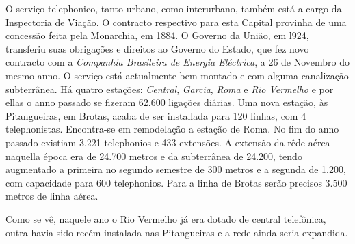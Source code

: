 \begin{citacao}
O serviço telephonico, tanto urbano, como interurbano, também está a cargo da Inspectoria de Viação.
O contracto respectivo para esta Capital provinha de uma concessão feita pela Monarchia, em 1884.
O Governo da União, em l924, transferiu suas obrigações e direitos ao Governo do Estado, que fez novo contracto com a \textit{Companhia Brasileira de Energia Eléctrica}, a 26 de Novembro do mesmo anno.
O serviço está actualmente bem montado e com alguma canalização subterrânea.
Há quatro estações: \textit{Central}, \textit{Garcia}, \textit{Roma} e \textit{Rio Vermelho} e por ellas o anno passado se fizeram 62.600 ligações diárias.
Uma nova estação, às Pitangueiras, em Brotas, acaba de ser installada para 120 linhas, com 4 telephonistas.
Encontra-se em remodelação a estação de Roma.
No fim do anno passado existiam 3.221 telephonios e 433 extensões.
A extensão da rêde aérea naquella época era de 24.700 metros e da subterrânea de 24.200, tendo augmentado a primeira no segundo semestre de 300 metros e a segunda
de 1.200, com capacidade para 600 telephonios.
Para a linha de Brotas serão precisos 3.500 metros de linha aérea. \cite[pp.~266-267]{bahia_rpe_1926}
\end{citacao}

Como se vê, naquele ano o Rio Vermelho já era dotado de central telefônica, outra havia sido recém-instalada nas Pitangueiras e a rede ainda seria expandida.